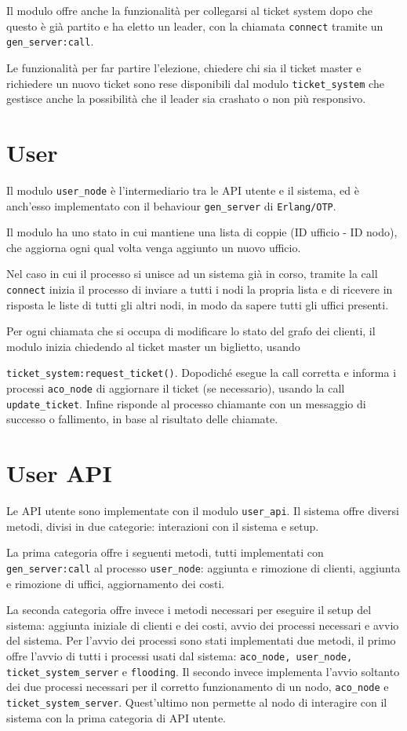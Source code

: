 Il modulo offre anche la funzionalità per collegarsi al ticket system dopo che questo è già partito
e ha eletto un leader, con la chiamata \texttt{connect} tramite un \texttt{gen\_server:call}.

Le funzionalità per far partire l'elezione, chiedere chi sia il ticket master e richiedere un nuovo ticket sono
rese disponibili dal modulo \texttt{ticket\_system} che gestisce anche la possibilità che il leader sia crashato
o non più responsivo.
\section{User}
Il modulo \texttt{user\_node} è l'intermediario tra le API utente e il sistema, ed è anch'esso implementato con il 
behaviour \texttt{gen\_server} di \texttt{Erlang/OTP}.

Il modulo ha uno stato in cui mantiene una lista di coppie (ID ufficio - ID nodo), che aggiorna ogni qual volta venga
aggiunto un nuovo ufficio.

Nel caso in cui il processo si unisce ad un sistema già in corso, tramite la call \texttt{connect} inizia il processo
di inviare a tutti i nodi la propria lista e di ricevere in risposta le liste di tutti gli altri nodi, in modo da
sapere tutti gli uffici presenti.

Per ogni chiamata che si occupa di modificare lo stato del grafo dei clienti, il modulo inizia chiedendo
al ticket master un biglietto, usando 

\texttt{ticket\_system:request\_ticket()}. Dopodiché esegue la call corretta e 
informa i processi \texttt{aco\_node} di aggiornare il ticket (se necessario), usando la call \texttt{update\_ticket}.
Infine risponde al processo chiamante con un messaggio di successo o fallimento, in base al risultato delle chiamate.

\section{User API}
Le API utente sono implementate con il modulo \texttt{user\_api}.
Il sistema offre diversi metodi, divisi in due categorie: interazioni con il sistema e setup.

La prima categoria offre i seguenti metodi, tutti implementati con 
\texttt{gen\_server:call} al processo \texttt{user\_node}:
aggiunta e rimozione di clienti, aggiunta e rimozione di uffici, aggiornamento dei costi.

La seconda categoria offre invece i metodi necessari per eseguire il setup del sistema:
aggiunta iniziale di clienti e dei costi, avvio dei processi necessari e avvio del sistema.
Per l'avvio dei processi sono stati implementati due metodi, il primo offre l'avvio di tutti i processi
usati dal sistema: \texttt{aco\_node, user\_node, ticket\_system\_server} e \texttt{flooding}. Il secondo
invece implementa l'avvio soltanto dei due processi necessari per il corretto funzionamento di un nodo, \texttt{aco\_node} e \texttt{ticket\_system\_server}.
Quest'ultimo non permette al nodo di interagire con il sistema con la prima categoria di API utente.

